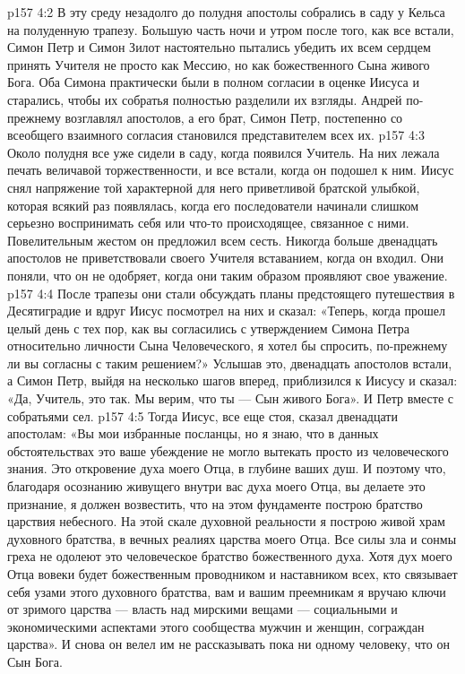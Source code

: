 \vs p157 4:2 В эту среду незадолго до полудня апостолы собрались в саду у Кельса на полуденную трапезу. Большую часть ночи и утром после того, как все встали, Симон Петр и Симон Зилот настоятельно пытались убедить их всем сердцем принять Учителя не просто как Мессию, но как божественного Сына живого Бога. Оба Симона практически были в полном согласии в оценке Иисуса и старались, чтобы их собратья полностью разделили их взгляды. Андрей по\hyp{}прежнему возглавлял апостолов, а его брат, Симон Петр, постепенно со всеобщего взаимного согласия становился представителем всех их.
\vs p157 4:3 Около полудня все уже сидели в саду, когда появился Учитель. На них лежала печать величавой торжественности, и все встали, когда он подошел к ним. Иисус снял напряжение той характерной для него приветливой братской улыбкой, которая всякий раз появлялась, когда его последователи начинали слишком серьезно воспринимать себя или что\hyp{}то происходящее, связанное с ними. Повелительным жестом он предложил всем сесть. Никогда больше двенадцать апостолов не приветствовали своего Учителя вставанием, когда он входил. Они поняли, что он не одобряет, когда они таким образом проявляют свое уважение.
\vs p157 4:4 После трапезы они стали обсуждать планы предстоящего путешествия в Десятиградие и вдруг Иисус посмотрел на них и сказал: «Теперь, когда прошел целый день с тех пор, как вы согласились с утверждением Симона Петра относительно личности Сына Человеческого, я хотел бы спросить, по\hyp{}прежнему ли вы согласны с таким решением?» Услышав это, двенадцать апостолов встали, а Симон Петр, выйдя на несколько шагов вперед, приблизился к Иисусу и сказал: «Да, Учитель, это так. Мы верим, что ты --- Сын живого Бога». И Петр вместе с собратьями сел.
\vs p157 4:5 Тогда Иисус, все еще стоя, сказал двенадцати апостолам: «Вы мои избранные посланцы, но я знаю, что в данных обстоятельствах это ваше убеждение не могло вытекать просто из человеческого знания. Это откровение духа моего Отца, в глубине ваших душ. И поэтому что, благодаря осознанию живущего внутри вас духа моего Отца, вы делаете это признание, я должен возвестить, что на этом фундаменте построю братство царствия небесного. На этой скале духовной реальности я построю живой храм духовного братства, в вечных реалиях царства моего Отца. Все силы зла и сонмы греха не одолеют это человеческое братство божественного духа. Хотя дух моего Отца вовеки будет божественным проводником и наставником всех, кто связывает себя узами этого духовного братства, вам и вашим преемникам я вручаю ключи от зримого царства --- власть над мирскими вещами --- социальными и экономическими аспектами этого сообщества мужчин и женщин, сограждан царства». И снова он велел им не рассказывать пока ни одному человеку, что он Сын Бога.
